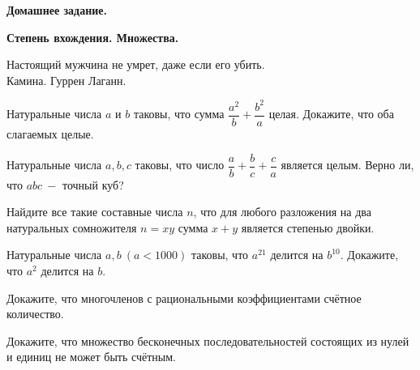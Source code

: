 \hspace{3mm}

\centerline{\bf \Huge Домашнее задание.}
\centerline{\bf \Huge Степень вхождения. Множества.}

\begin{flushright}
    \scriptsize{Настоящий мужчина не умрет, даже если его убить.\\Камина. Гуррен Лаганн.}
\end{flushright}


 Натуральные числа $a$ и $b$ таковы, что сумма $\dfrac{a^2}{b} + \dfrac{b^2}{a}$ целая. Докажите, что оба слагаемых целые.

 Натуральные числа $a, b, c$ таковы, что число $\dfrac{a}{b} + \dfrac{b}{c} +\dfrac{c}{a}$ является целым. Верно ли, что  $abc \ - $ точный куб?


 Найдите все такие составные числа $n$, что для любого разложения на два натуральных сомножителя $n= xy$   сумма $x+y$   является степенью двойки.

 Натуральные числа $a, b \ (a<1000)$ таковы, что $a^{21}$ делится на $b^{10}$. Докажите, что $a^2$ делится на $b$.

 Докажите, что многочленов с рациональными коэффициентами счётное количество.

 Докажите, что множество бесконечных последовательностей состоящих из нулей и единиц не может быть счётным.


\hspace{3mm}
